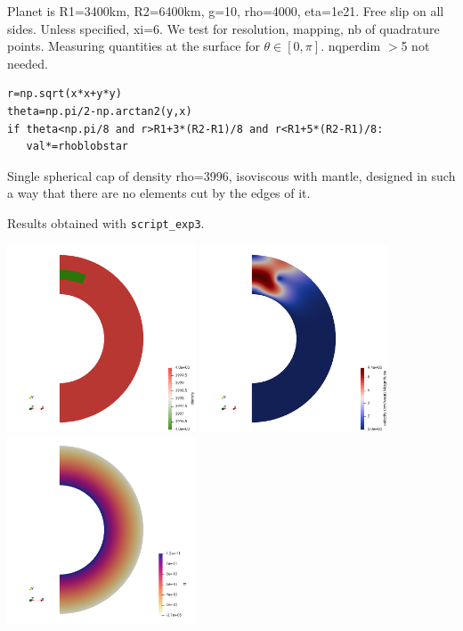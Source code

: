 Planet is R1=3400km, R2=6400km, g=10, rho=4000, eta=1e21.
Free slip on all sides. Unless specified, xi=6.
We test for resolution, mapping, nb of quadrature points.
Measuring quantities at the surface for $\theta\in[0,\pi]$.
nqperdim $>$5  not needed. 

\begin{lstlisting}
r=np.sqrt(x*x+y*y)
theta=np.pi/2-np.arctan2(y,x)
if theta<np.pi/8 and r>R1+3*(R2-R1)/8 and r<R1+5*(R2-R1)/8:
   val*=rhoblobstar
\end{lstlisting}

Single spherical cap of density rho=3996, isoviscous with mantle,
designed in such a way that there are no elements cut by the edges of it.

Results obtained with {\tt script\_exp3}.

\begin{center}
\includegraphics[width=5.6cm]{python_codes/fieldstone_152/RESULTS/exp3/rho}
\includegraphics[width=5.6cm]{python_codes/fieldstone_152/RESULTS/exp3/vel}
\includegraphics[width=5.6cm]{python_codes/fieldstone_152/RESULTS/exp3/press}
\end{center}

